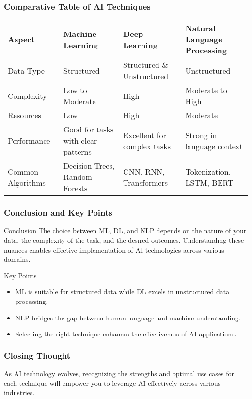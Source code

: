\documentclass{beamer}
\begin{document}
\begin{frame}[fragile]
    \frametitle{Comparative Table of AI Techniques}
    \begin{center}
    \begin{tabular}{|l|l|l|l|}
        \hline
        Aspect & Machine Learning & Deep Learning & Natural Language Processing \\
        \hline
        Data Type & Structured & Structured \& Unstructured & Unstructured \\
        \hline
        Complexity & Low to Moderate & High & Moderate to High \\
        \hline
        Resources & Low & High & Moderate \\
        \hline
        Performance & Good for tasks with clear patterns & Excellent for complex tasks & Strong in language context \\
        \hline
        Common Algorithms & Decision Trees, Random Forests & CNN, RNN, Transformers & Tokenization, LSTM, BERT \\
        \hline
    \end{tabular}
    \end{center}
\end{frame}

\begin{frame}[fragile]
    \frametitle{Conclusion and Key Points}
    \begin{block}{Conclusion}
        The choice between ML, DL, and NLP depends on the nature of your data, 
        the complexity of the task, and the desired outcomes. 
        Understanding these nuances enables effective implementation of 
        AI technologies across various domains.
    \end{block}
    
    \begin{block}{Key Points}
        \begin{itemize}
            \item ML is suitable for structured data while DL excels in unstructured data processing.
            \item NLP bridges the gap between human language and machine understanding.
            \item Selecting the right technique enhances the effectiveness of AI applications.
        \end{itemize}
    \end{block}
\end{frame}

\begin{frame}[fragile]
    \frametitle{Closing Thought}
    As AI technology evolves, recognizing the strengths and optimal use cases for 
    each technique will empower you to leverage AI effectively across various industries.
\end{frame}
\end{document}
